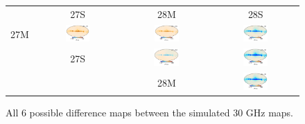 \documentclass{aa}
\begin{document}
\begin{figure}
\begin{tabular}{B C C C}
& 27S & 28M & 28S\\
  27M & \includegraphics[width=0.30\textwidth]{figs/sim_27M_minus_27S.pdf} & 
\includegraphics[width=0.30\textwidth]{figs/sim_27M_minus_28M.pdf} &
\includegraphics[width=0.31\textwidth]{figs/sim_27M_minus_28S.pdf}\\
 & \hspace{4.8cm } 27S & \includegraphics[width=0.31\textwidth]{figs/sim_27S_minus_28M.pdf} &
 \includegraphics[width=0.31\textwidth]{figs/sim_27S_minus_28S.pdf}\\
 & \caption{All 6 possible difference maps between the simulated 30 GHz maps. } &  \hspace{4.7cm }  28M  & \includegraphics[width=0.31\textwidth]{figs/sim_28M_minus_28S.pdf} \\
  \end{tabular}
\vspace{-0.75cm}
      \label{fig:bp_diffs}
\end{figure}
\end{document}
